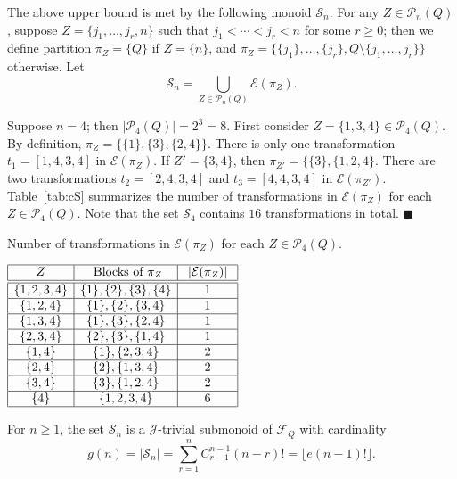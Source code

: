 \documentclass{llncs}
\renewcommand{\ge}{\geqslant}
\newcommand{\txt}[1]{\mbox{ #1 }}
\newcommand{\cE}{{\mathcal E}}
\newcommand{\cF}{{\mathcal F}}
\newcommand{\cP}{{\mathcal P}}
\newcommand{\cS}{{\mathcal S}}
\newcommand{\gJ}{{\mathcal J}}
\newcommand{\qedb}{\hfill$\blacksquare$}
\begin{document}
The above upper bound is met by the following monoid $\cS_n$. For any $Z \in \cP_n(Q)$, suppose $Z = \{j_1, \ldots, j_r,n\}$ such that $j_1 < \cdots < j_r < n$ for some $r \ge 0$; then we define partition $\pi_Z = \{Q\}$ if $Z = \{n\}$, and $\pi_Z = \{\{j_1\}, \ldots, \{j_r\}, Q \setminus \{j_1,\ldots,j_r\}\}$ otherwise. Let 
$$\cS_n = \bigcup_{Z \in \cP_n(Q)} \cE(\pi_Z).$$

\begin{example}\label{ex:cS} 
Suppose $n = 4$; then $|\cP_4(Q)| = 2^3 = 8$. First consider $Z = \{1,3,4\} \in \cP_4(Q)$. By definition, $\pi_Z = \{\{1\}, \{3\}, \{2,4\}\}$. There is only one transformation $t_1 = [1,4,3,4]$ in $\cE(\pi_Z)$. If $Z' = \{3,4\}$, then $\pi_{Z'} = \{\{3\}, \{1,2,4\}$. There are two transformations $t_2 = [2,4,3,4]$ and $t_3 = [4,4,3,4]$ in $\cE(\pi_{Z'})$. Table~\ref{tab:cS} summarizes the number of transformations in $\cE(\pi_Z)$ for each $Z \in \cP_4(Q)$. Note that the set $\cS_4$ contains $16$ transformations in total. 
\qedb


\begin{table}[hbt]
\caption{Number of transformations in $\cE(\pi_Z)$ for each $Z \in \cP_4(Q)$.}
\label{tab:cS}
\begin{center}
$
\begin{array}{|c|c|c|}    
\hline
 ~Z~ & ~\txt{Blocks of} \pi_Z~ & ~|\cE(\pi_Z)|~ \\ 
\hline \hline
 \{1,2,3,4\} & \{1\}, \{2\}, \{3\}, \{4\} & 1 \\
\hline 
 \{1,2,4\}   & \{1\}, \{2\}, \{3,4\}      & 1 \\
\hline 
 \{1,3,4\}   & \{1\}, \{3\}, \{2,4\}      & 1 \\
\hline  
 \{2,3,4\}   & \{2\}, \{3\}, \{1,4\}      & 1 \\
\hline 
 \{1,4\}     & \{1\}, \{2,3,4\}           & 2 \\
\hline 
 \{2,4\}     & \{2\}, \{1,3,4\}           & 2 \\
\hline 
 \{3,4\}     & \{3\}, \{1,2,4\}           & 2 \\
\hline 
 \{4\}       & \{1,2,3,4\}                & 6 \\
\hline
\end{array}
$
\end{center}
\end{table}
\end{example}





\begin{proposition}\label{prop:cS}
For $n \ge 1$, the set $\cS_n$ is a $\gJ$-trivial submonoid of $\cF_Q$ with cardinality 
\begin{equation}\label{eq:gt}
  g(n) = |\cS_n| = \sum_{r=1}^n C^{n-1}_{r-1} (n-r)! = \lfloor e(n-1)! \rfloor. 
\end{equation}
\end{proposition}
\end{document}
